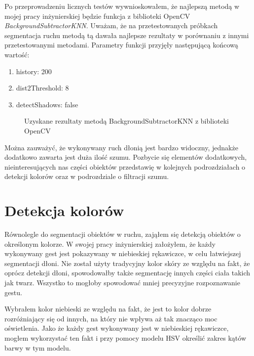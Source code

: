 \documentclass[a4paper,12pt,twoside,openany]{report}
\newcommand{\ImgPath}{.}
\begin{document}
Po przeprowadzeniu licznych testów wywnioskowałem, że najlepszą metodą w mojej pracy inżynierskiej będzie funkcja z biblioteki OpenCV \textit{BackgroundSubtractorKNN}. Uważam, że na przetestowanych próbkach segmentacja ruchu metodą tą dawała najlepsze rezultaty w porównaniu z innymi przetestowanymi metodami. Parametry funkcji przyjęły następującą końcową wartość:
\begin{enumerate}
	\item history: 200
	\item dist2Threshold: 8
	\item detectShadows: false
\end{enumerate}

\begin{figure}[H]
	\centering
	\caption{Uzyskane rezultaty metodą BackgroundSubtractorKNN z biblioteki OpenCV}
\end{figure}


Można zauważyć, że wykonywany ruch dłonią jest bardzo widoczny, jednakże dodatkowo zawarta jest duża ilość szumu. Pozbycie się elementów dodatkowych, nieinteresujących nas części obiektów przedstawię w kolejnych podrozdziałach o detekcji kolorów oraz w podrozdziale o filtracji szumu. 

\section{Detekcja kolorów}
Równolegle do segmentacji obiektów w ruchu, zająłem się detekcją obiektów o określonym kolorze. W swojej pracy inżynierskiej założyłem, że każdy wykonywany gest jest pokazywany w niebieskiej rękawiczce, w celu łatwiejszej segmentacji dłoni. Nie został użyty tradycyjny kolor skóry ze względu na fakt, że oprócz detekcji dłoni, spowodowałby także segmentację innych części ciała takich jak twarz. Wszystko to mogłoby spowodować mniej precyzyjne rozpoznawanie gestu.

Wybrałem kolor niebieski ze względu na fakt, że jest to kolor dobrze rozróżniający się od innych, na który nie wpływa aż tak znacząco moc oświetlenia.
Jako że każdy gest wykonywany jest w niebieskiej rękawiczce, mogłem wykorzystać ten fakt i przy pomocy modelu HSV określić zakres kątów barwy w tym modelu. 
 
\end{document}
